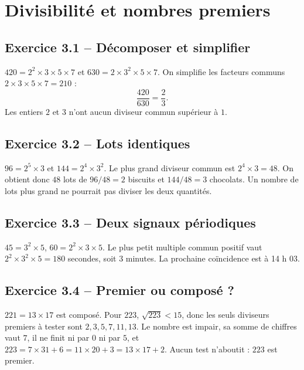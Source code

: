 \chapter{Divisibilité et nombres premiers}
\label{corriges:03}
\section*{Exercice 3.1 -- Décomposer et simplifier}
$420=2^2\times3\times5\times7$ et $630=2\times3^2\times5\times7$. On simplifie les facteurs communs $2\times3\times5\times7=210$ :
\[\frac{420}{630}=\frac23.\]
Les entiers $2$ et $3$ n'ont aucun diviseur commun supérieur à $1$.

\section*{Exercice 3.2 -- Lots identiques}
$96=2^5\times3$ et $144=2^4\times3^2$. Le plus grand diviseur commun est $2^4\times3=48$. On obtient donc $48$ lots de $96/48=2$ biscuits et $144/48=3$ chocolats. Un nombre de lots plus grand ne pourrait pas diviser les deux quantités.

\section*{Exercice 3.3 -- Deux signaux périodiques}
$45=3^2\times5$, $60=2^2\times3\times5$. Le plus petit multiple commun positif vaut $2^2\times3^2\times5=180$ secondes, soit $3$ minutes. La prochaine coïncidence est à 14 h 03.

\section*{Exercice 3.4 -- Premier ou composé ?}
$221=13\times17$ est composé. Pour $223$, $\sqrt{223}<15$, donc les seuls diviseurs premiers à tester sont $2,3,5,7,11,13$. Le nombre est impair, sa somme de chiffres vaut $7$, il ne finit ni par $0$ ni par $5$, et
$223=7\times31+6=11\times20+3=13\times17+2$.
Aucun test n'aboutit : $223$ est premier.
